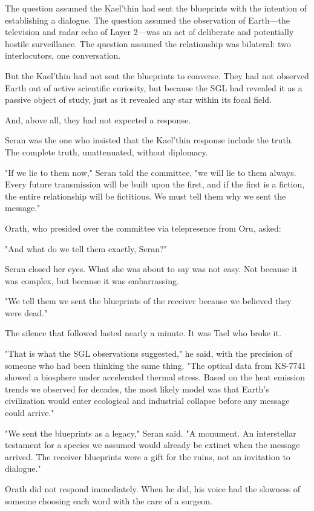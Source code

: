 \documentclass[11pt,a5paper,twoside]{book}
\begin{document}
The question assumed the Kael'thin had sent the blueprints with the intention of establishing a dialogue. The question assumed the observation of Earth—the television and radar echo of Layer 2—was an act of deliberate and potentially hostile surveillance. The question assumed the relationship was bilateral: two interlocutors, one conversation.

But the Kael'thin had not sent the blueprints to converse. They had not observed Earth out of active scientific curiosity, but because the SGL had revealed it as a passive object of study, just as it revealed any star within its focal field.

And, above all, they had not expected a response.

Seran was the one who insisted that the Kael'thin response include the truth. The complete truth, unattenuated, without diplomacy.

"If we lie to them now," Seran told the committee, "we will lie to them always. Every future transmission will be built upon the first, and if the first is a fiction, the entire relationship will be fictitious. We must tell them why we sent the message."

Orath, who presided over the committee via telepresence from Oru, asked:

"And what do we tell them exactly, Seran?"

Seran closed her eyes. What she was about to say was not easy. Not because it was complex, but because it was embarrassing.

"We tell them we sent the blueprints of the receiver because we believed they were dead."

The silence that followed lasted nearly a minute. It was Tael who broke it.

"That is what the SGL observations suggested," he said, with the precision of someone who had been thinking the same thing. "The optical data from KS-7741 showed a biosphere under accelerated thermal stress. Based on the heat emission trends we observed for decades, the most likely model was that Earth's civilization would enter ecological and industrial collapse before any message could arrive."

"We sent the blueprints as a legacy," Seran said. "A monument. An interstellar testament for a species we assumed would already be extinct when the message arrived. The receiver blueprints were a gift for the ruins, not an invitation to dialogue."

Orath did not respond immediately. When he did, his voice had the slowness of someone choosing each word with the care of a surgeon.
\end{document}
